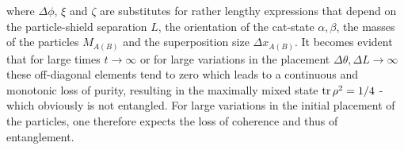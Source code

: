 where $\Delta \phi$, $\xi$ and $\zeta$ are substitutes for rather lengthy expressions that depend on the particle-shield separation $L$, the orientation of the cat-state $\alpha, \beta$, the masses of the particles $M_{A(B)}$ and the superposition size $\Delta x_{A(B)}$.
It becomes evident that for large times $t\rightarrow \infty$ or for large variations in the placement $\Delta \theta, \Delta L \rightarrow \infty$ these off-diagonal elements tend to zero which leads to a continuous and monotonic loss of purity, resulting in the maximally mixed state $\tr\rho^2 = 1/4$ - which obviously is not entangled.
For large variations in the initial placement of the particles, one therefore expects the loss of coherence and thus of entanglement.

